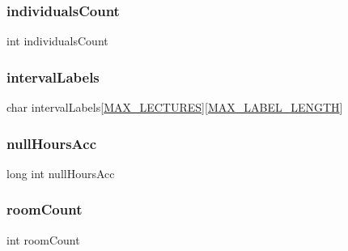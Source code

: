 \hypertarget{structparams_aeca69d2fb21ed26b662e49d760c2e332}{}\label{structparams_aeca69d2fb21ed26b662e49d760c2e332} 
\subsubsection{\texorpdfstring{individuals\+Count}{individualsCount}}
{\footnotesize\ttfamily int individuals\+Count}

\hypertarget{structparams_a0f99e938bd12ec5d93841fe380ed9e82}{}\label{structparams_a0f99e938bd12ec5d93841fe380ed9e82} 
\subsubsection{\texorpdfstring{interval\+Labels}{intervalLabels}}
{\footnotesize\ttfamily char interval\+Labels\mbox{[}\hyperlink{main_8c_a152499a7a91751df0c7f203a60a88003}{M\+A\+X\+\_\+\+L\+E\+C\+T\+U\+R\+ES}\mbox{]}\mbox{[}\hyperlink{main_8c_a40953fb1d014188b77bbf6d21d0b3e6c}{M\+A\+X\+\_\+\+L\+A\+B\+E\+L\+\_\+\+L\+E\+N\+G\+TH}\mbox{]}}

\hypertarget{structparams_a7603f636641dd6762e9a1582394063f0}{}\label{structparams_a7603f636641dd6762e9a1582394063f0} 
\subsubsection{\texorpdfstring{null\+Hours\+Acc}{nullHoursAcc}}
{\footnotesize\ttfamily long int null\+Hours\+Acc}

\hypertarget{structparams_a90c3ccdd5d149c3fa002c1bb5bde0a20}{}\label{structparams_a90c3ccdd5d149c3fa002c1bb5bde0a20} 
\subsubsection{\texorpdfstring{room\+Count}{roomCount}}
{\footnotesize\ttfamily int room\+Count}

\hypertarget{structparams_a90276c18a08cf33875cf493a4cdaa804}{}\label{structparams_a90276c18a08cf33875cf493a4cdaa804} 
